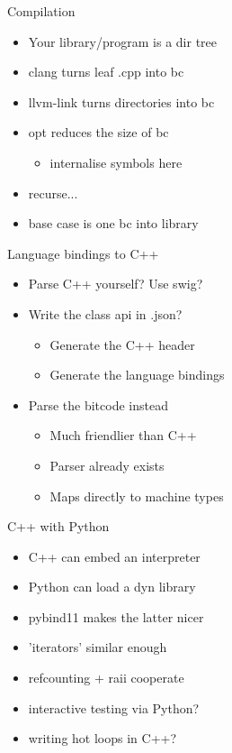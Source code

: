 \documentclass[20pt]{beamer}
\begin{document}
\begin{frame}{Compilation}
  \begin{itemize}
  \item Your library/program is a dir tree
  \item clang turns leaf .cpp into bc
  \item llvm-link turns directories into bc
  \item opt reduces the size of bc
    \begin{itemize}
    \item internalise symbols here
    \end{itemize}
  \item recurse...
  \item base case is one bc into library
  \end{itemize}
\end{frame}


\begin{frame}{Language bindings to C++}
  \begin{itemize}
  \item Parse C++ yourself? Use swig?
  \item Write the class api in .json?
    \begin{itemize}
    \item Generate the C++ header
    \item Generate the language bindings
    \end{itemize}
  \item Parse the bitcode instead
    \begin{itemize}
    \item Much friendlier than C++
    \item Parser already exists
    \item Maps directly to machine types
    \end{itemize}
  \end{itemize}
\end{frame}

\begin{frame}{C++ with Python}
  \begin{itemize}
  \item C++ can embed an interpreter
  \item Python can load a dyn library
  \item pybind11 makes the latter nicer
  \item 'iterators' similar enough
  \item refcounting + raii cooperate
  \item interactive testing via Python?
  \item writing hot loops in C++?
  \end{itemize}
\end{frame}
\end{document}
